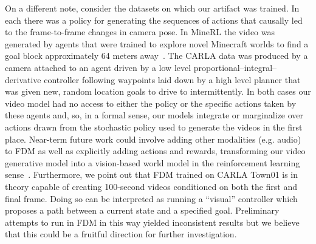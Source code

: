 On a different note, consider the datasets on which our artifact was trained.  In each there was a policy for generating the sequences of actions that causally led to the frame-to-frame changes in camera pose.  In MineRL the video was generated by agents that were trained to explore novel Minecraft worlds to find a goal block approximately 64 meters away~\cite{guss2019minerl}. The CARLA data was produced by a camera attached to an agent driven by a low level proportional–integral–derivative controller following waypoints laid down by a high level planner that was given new, random location goals to drive to intermittently. In both cases our video model had no access to either the policy or the specific actions taken by these agents and, so, in a formal sense, our models integrate or marginalize over actions drawn from the stochastic policy used to generate the videos in the first place.
%
Near-term future work could involve adding other modalities (e.g. audio) to FDM as well as explicitly adding actions and rewards, transforming our video generative model into a vision-based world model in the reinforcement learning sense~\citep{igl2018deep,kaiser2019model}. Furthermore, we point out that FDM trained on CARLA Town01 is in theory capable of creating 100-second videos conditioned on both the first and final frame. Doing so can be interpreted as running a ``visual'' controller which proposes a path between a current state and a specified goal.
%
Preliminary attempts to run in FDM in this way yielded inconsistent results but we believe that this could be a fruitful direction for further investigation.
